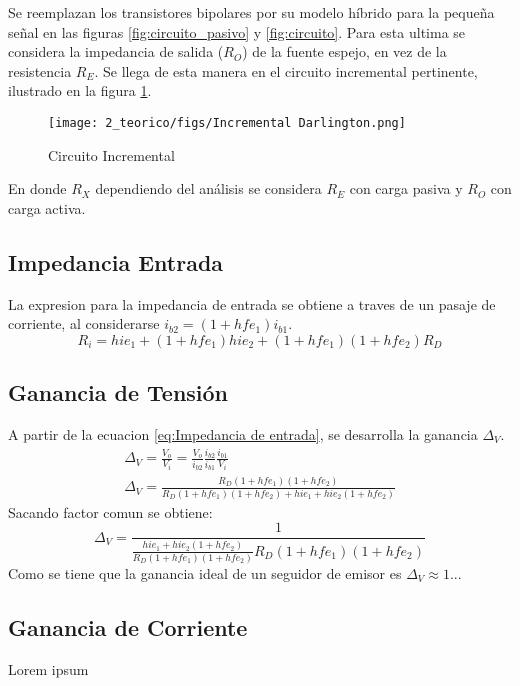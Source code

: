 Se reemplazan los transistores bipolares por su modelo híbrido para la pequeña señal en las figuras \ref{fig:circuito_pasivo} y \ref{fig:circuito}. Para esta ultima se considera la impedancia de salida ($R_O$) de la fuente espejo, en vez de la resistencia $R_E$.
Se llega de esta manera en el circuito incremental pertinente, ilustrado en la figura \ref{fig:circuito incremental darlington}.

\begin{figure}[ht]
    \centering
    \texttt{[image: 2\_teorico/figs/Incremental Darlington.png]}
    \caption{Circuito Incremental}
    \label{fig:circuito incremental darlington}
\end{figure}
En donde $R_X$ dependiendo del análisis se considera $R_E$ con carga pasiva y $R_O$ con carga activa. 


\subsection{Impedancia Entrada}

La expresion para la impedancia de entrada se obtiene a traves de un pasaje de corriente, al considerarse $i_{b2} = (1+hfe_1)i_{b1}$.
\begin{equation}
    R_i = hie_1 + (1+hfe_1)hie_2 + (1+hfe_1)(1+hfe_2)R_D
    \label{eq:Impedancia de entrada}
\end{equation}

\subsection{Ganancia de Tensión}
A partir de la ecuacion \ref{eq:Impedancia de entrada}, se desarrolla la ganancia $\Delta_V$.
\begin{align}
    \Delta_V = \frac{V_o}{V_i} = \frac{V_o}{i_{b2}} \frac{i_{b2}}{i_{b1}} \frac{i_{b1}}{V_i} \\
    \Delta_V = \frac{R_D(1+hfe_1)(1+hfe_2)}{R_D(1+hfe_1)(1+hfe_2) + hie_1 + hie_2(1+hfe_2)}
\end{align}
Sacando factor comun se obtiene:
\begin{equation}
    \Delta_V = \frac{1}{\frac{hie_1 + hie_2(1+hfe_2)}{R_D(1+hfe_1)(1+hfe_2)}{R_D(1+hfe_1)(1+hfe_2)}}
\end{equation}
Como se tiene que la ganancia ideal de un seguidor de emisor es $\Delta_V \approx 1$...


\subsection{Ganancia de Corriente}
Lorem ipsum
